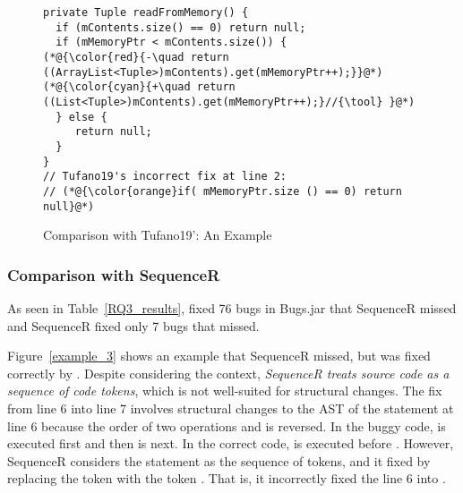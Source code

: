 \begin{figure}[t]
	\centering
	\begin{lstlisting}[]
private Tuple readFromMemory() {
  if (mContents.size() == 0) return null;
  if (mMemoryPtr < mContents.size()) {
(*@{\color{red}{-\quad return ((ArrayList<Tuple>)mContents).get(mMemoryPtr++);}}@*)
(*@{\color{cyan}{+\quad return ((List<Tuple>)mContents).get(mMemoryPtr++);}//{\tool} }@*)
  } else {
     return null;
  }
}
// Tufano19's incorrect fix at line 2:
// (*@{\color{orange}if( mMemoryPtr.size () == 0) return null}@*) 
	\end{lstlisting}
        \vspace{-15pt}
	\caption{Comparison with Tufano19': An Example}
	\label{example_tufano19}
\end{figure}

\subsubsection{\bf Comparison with SequenceR}

As seen in Table~\ref{RQ3_results}, {\tool} fixed 76 bugs in Bugs.jar
that SequenceR missed and SequenceR fixed only 7 bugs that
{\tool} missed.

Figure~\ref{example_3} shows an example that SequenceR missed, but was
fixed correctly by {\tool}. Despite considering the context, {\em
  SequenceR treats source code as a sequence of code tokens}, which is
not well-suited for structural changes. The fix from line 6 into line
7 involves structural changes to the AST of the statement at line 6
because the order of two operations  and \code{\%} is
reversed. In the buggy code,  is executed first and then
\code{\%} is next. In the correct code, \code{\%} is executed before
.
However, SequenceR considers the statement as the sequence of tokens,
and it fixed by replacing the token  with the token
. That is, it incorrectly fixed the line 6 into
   
\code{\%} .

